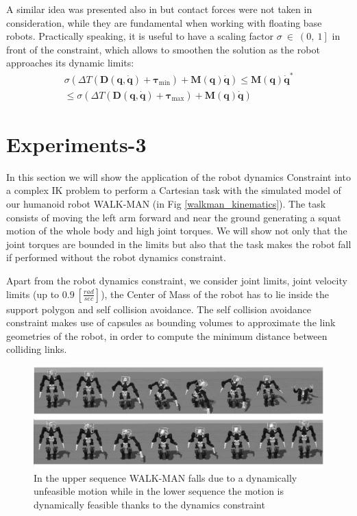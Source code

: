 A similar idea was presented also in \cite{park1998-ib} but contact forces were not taken in consideration, while they are fundamental when working with floating base robots.
Practically speaking, it is useful to have a scaling factor $\sigma \ \in \ \left(0, \ 1 \right]$ in front of the constraint, which allows to smoothen the solution as the robot approaches its dynamic limits:
\begin{multline}
\sigma \left(\Delta T \left(\mathbf{D}(\mathbf{q}, \mathbf{\dot{q}}) + \boldsymbol{\tau}_\text{min}\right ) + \mathbf{M}(\mathbf{q})\mathbf{\dot{q}} \right)\leq
\mathbf{M}(\mathbf{q})\mathbf{\dot{q}}^* \\
\leq  \sigma \left(\Delta T \left(\mathbf{D}(\mathbf{q}, \mathbf{\dot{q}}) + \boldsymbol{\tau}_\text{max}\right)+ \mathbf{M}(\mathbf{q})\mathbf{\dot{q}}\right)
\label{robot_dynamics_constraint_2}
\end{multline}


\section{Experiments-3}
\label{sec:experiments3}
In this section we will show the application of the robot dynamics Constraint into a complex IK problem to perform a Cartesian task with the simulated model of our humanoid robot WALK-MAN (in Fig \ref{walkman_kinematics}). The task consists of moving the left arm forward and near the ground generating a squat motion of the whole body and high joint torques. We will show not only that the joint torques are bounded in the limits but also that the task makes the robot fall if performed without the robot dynamics constraint. 

Apart from the robot dynamics constraint, we consider joint limits, joint velocity limits (up to $0.9 \ \left[ \frac{rad}{sec} \right]$), the Center of Mass of the robot has to lie inside the support polygon and self collision avoidance. 
The self collision avoidance constraint makes use of capsules as bounding volumes to approximate the link geometries of the robot, in order to compute the minimum distance between colliding links.

\begin{figure}[htb] 
\centering 
\includegraphics[width=\textwidth]{images/dynamic_constr.eps} 
\caption{In the upper sequence WALK-MAN falls due to a dynamically unfeasible motion while in the lower sequence the motion is dynamically feasible thanks to the dynamics constraint} 
\label{gazebo}
\end{figure}

